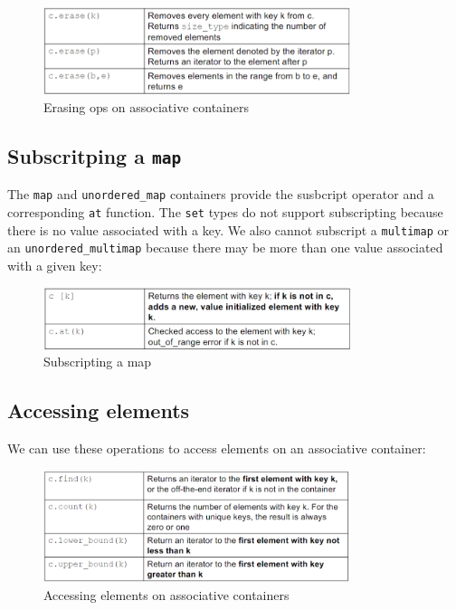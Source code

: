 \begin{figure}[H]
    \centering
    \includegraphics[width=0.8\textwidth]{figures/erasing_associative.png}
    \caption{Erasing ops on associative containers}
    \label{fig:erasing_associative}
\end{figure}

\subsection{Subscritping a \texttt{map}}

The \texttt{map} and \texttt{unordered\_map} containers provide the susbcript operator and a 
corresponding \texttt{at} function. The \texttt{set} types do not support subscripting because
there is no value associated with a key. We also cannot subscript a \texttt{multimap} or an
\texttt{unordered\_multimap} because there may be more than one value associated with a given key:

\begin{figure}[H]
    \centering
    \includegraphics[width=0.8\textwidth]{figures/subscripting_map.png}
    \caption{Subscripting a map}
    \label{fig:map_subscript}
\end{figure}

\subsection{Accessing elements} 

We can use these operations to access elements on an associative container:

\begin{figure}[H]
    \centering
    \includegraphics[width=0.8\textwidth]{figures/accessing_associative.png}
    \caption{Accessing elements on associative containers}
    \label{fig:accessig_associative}
\end{figure}

